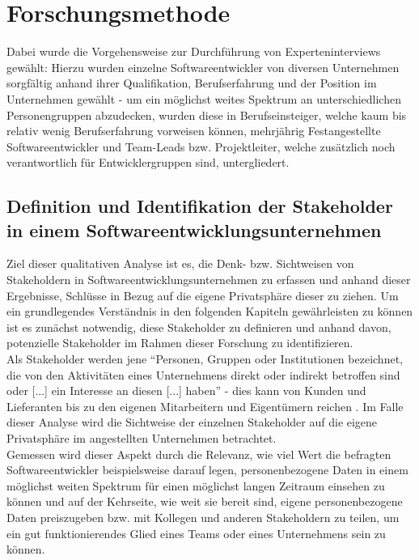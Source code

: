\chapter{Forschungsmethode} %
\label{Research} %

Dabei wurde die Vorgehensweise zur Durchführung von Experteninterviews gewählt: Hierzu wurden einzelne Softwareentwickler von diversen Unternehmen sorgfältig
anhand ihrer Qualifikation, Berufserfahrung und der Position im Unternehmen gewählt - um ein möglichst weites Spektrum an unterschiedlichen Personengruppen abzudecken, wurden diese in Berufseinsteiger,
welche kaum bis relativ wenig Berufserfahrung vorweisen können, mehrjährig Festangestellte Softwareentwickler und Team-Leads bzw. Projektleiter, welche zusätzlich noch verantwortlich für Entwicklergruppen sind,
untergliedert.

\section{Definition und Identifikation der Stakeholder in einem Softwareentwicklungsunternehmen}
Ziel dieser qualitativen Analyse ist es, die Denk- bzw. Sichtweisen von Stakeholdern in Softwareentwicklungsunternehmen zu erfassen und anhand dieser Ergebnisse, Schlüsse in Bezug auf die
eigene Privatsphäre dieser zu ziehen. Um ein grundlegendes Verständnis in den folgenden Kapiteln gewährleisten zu können ist es zunächst notwendig, diese Stakeholder zu definieren und anhand davon, 
potenzielle Stakeholder im Rahmen dieser Forschung zu identifizieren. \\ Als Stakeholder werden jene \enquote{Personen, Gruppen oder Institutionen bezeichnet, die von den Aktivitäten eines Unternehmens 
direkt oder indirekt betroffen sind oder [...] ein Interesse an diesen [...] haben} \cite{Fle:16} - dies kann von Kunden und Lieferanten bis zu den eigenen Mitarbeitern und Eigentümern reichen \cite{Fle:16}. 
Im Falle dieser Analyse wird die Sichtweise der einzelnen Stakeholder auf die eigene Privatsphäre im angestellten Unternehmen betrachtet. \\ Gemessen wird dieser Aspekt durch die Relevanz, wie viel Wert die befragten
Softwareentwickler beispielsweise darauf legen, personenbezogene Daten in einem möglichst weiten Spektrum für einen möglichst langen Zeitraum einsehen zu können und auf der Kehrseite, wie weit sie bereit sind, eigene
personenbezogene Daten preiszugeben bzw. mit Kollegen und anderen Stakeholdern zu teilen, um ein gut funktionierendes Glied eines Teams oder eines Unternehmens sein zu können.

